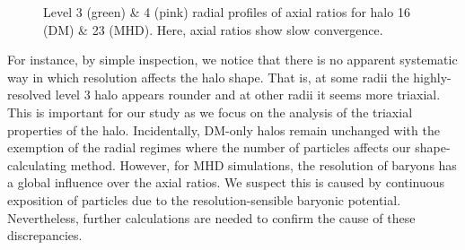 \begin{figure}[!ht]
  \centering
  \hfill%
  \caption{Level 3 (green) \& 4 (pink) radial profiles of axial ratios for halo 16 (DM) \& 23 (MHD). Here, axial ratios show slow convergence. }
  \label{fig:badConvergence}
\end{figure}


For instance, by simple inspection, we notice that there is no apparent systematic way in which resolution affects the halo shape. That is, at some radii the highly-resolved level 3 halo appears rounder and at other radii it seems more triaxial. This is important for our study as we focus on the analysis of the triaxial properties of the halo. Incidentally, DM-only halos remain unchanged with the exemption of the radial regimes where the number of particles affects our shape-calculating method. However, for MHD simulations, the resolution of baryons has a global influence over the axial ratios. We suspect this is caused by continuous exposition of particles due to the resolution-sensible baryonic potential. Nevertheless, further calculations are needed to confirm the cause of these discrepancies.\\

